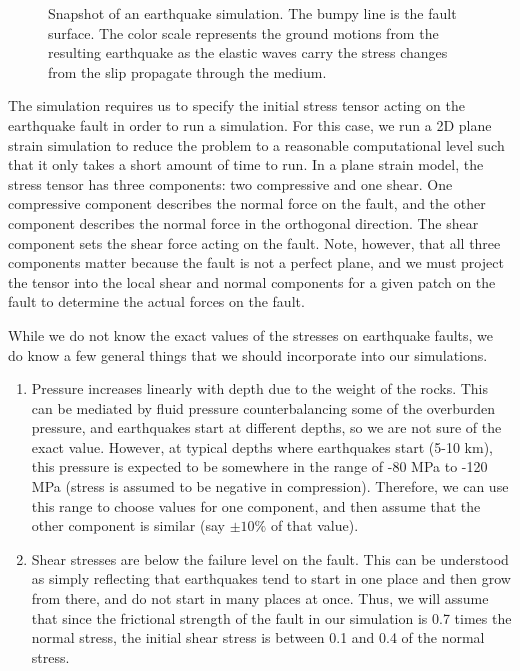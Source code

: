 \documentclass[openacc]{rstransa}%
\begin{document}
\begin{figure}[!h]
\caption{Snapshot of an earthquake simulation. The bumpy line is the fault surface. The color scale represents the ground motions from the resulting earthquake as the elastic waves carry the stress changes from the slip propagate through the medium.}
\label{fig_sim}
\end{figure}

The simulation requires us to specify the initial stress tensor acting on the earthquake fault in order to run a simulation. For this case, we run a 2D plane strain simulation to reduce the problem to a reasonable computational level such that it only takes a short amount of time to run. In a plane strain model, the stress tensor has three components: two compressive and one shear. One compressive component describes the normal force on the fault, and the other component describes the normal force in the orthogonal direction. The shear component sets the shear force acting on the fault. Note, however, that all three components matter because the fault is not a perfect plane, and we must project the tensor into the local shear and normal components for a given patch on the fault to determine the actual forces on the fault.

While we do not know the exact values of the stresses on earthquake faults, we do know a few general things that we should incorporate into our simulations.

\begin{enumerate}
\item Pressure increases linearly with depth due to the weight of the rocks. This can be mediated by fluid pressure counterbalancing some of the overburden pressure, and earthquakes start at different depths, so we are not sure of the exact value. However, at typical depths where earthquakes start (5-10 km), this pressure is expected to be somewhere in the range of -80 MPa to -120 MPa (stress is assumed to be negative in compression). Therefore, we can use this range to choose values for one component, and then assume that the other component is similar (say $\pm 10\%$ of that value).
\item Shear stresses are below the failure level on the fault. This can be understood as simply reflecting that earthquakes tend to start in one place and then grow from there, and do not start in many places at once. Thus, we will assume that since the frictional strength of the fault in our simulation is 0.7 times the normal stress, the initial shear stress is between 0.1 and 0.4 of the normal stress.
\end{enumerate}
\end{document}
